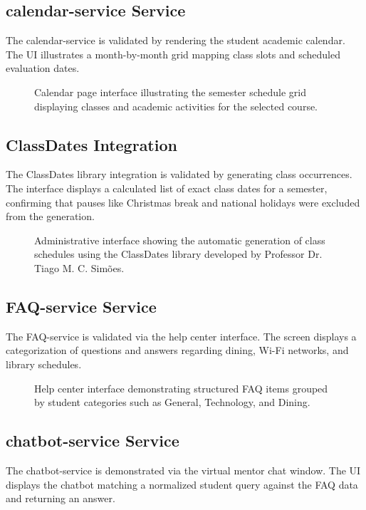 \documentclass[12pt]{article}
\begin{document}
\subsection{calendar-service Service}
The calendar-service is validated by rendering the student academic calendar. The UI illustrates a month-by-month grid mapping class slots and scheduled evaluation dates.

\begin{figure}[htbp]
    \centering
    \caption{Calendar page interface illustrating the semester schedule grid displaying classes and academic activities for the selected course.}
    \label{fig:calendar_view}
\end{figure}

\subsection{ClassDates Integration}
The ClassDates library integration is validated by generating class occurrences. The interface displays a calculated list of exact class dates for a semester, confirming that pauses like Christmas break and national holidays were excluded from the generation.

\begin{figure}[htbp]
    \centering
    \caption{Administrative interface showing the automatic generation of class schedules using the ClassDates library developed by Professor Dr. Tiago M. C. Simões.}
    \label{fig:classdates_generation}
\end{figure}

\subsection{FAQ-service Service}
The FAQ-service is validated via the help center interface. The screen displays a categorization of questions and answers regarding dining, Wi-Fi networks, and library schedules.

\begin{figure}[htbp]
    \centering
    \caption{Help center interface demonstrating structured FAQ items grouped by student categories such as General, Technology, and Dining.}
    \label{fig:faq_list}
\end{figure}

\subsection{chatbot-service Service}
The chatbot-service is demonstrated via the virtual mentor chat window. The UI displays the chatbot matching a normalized student query against the FAQ data and returning an answer.
\end{document}
